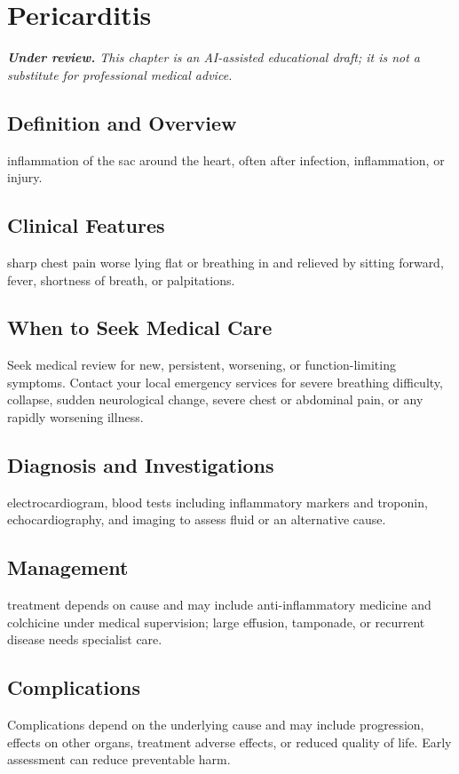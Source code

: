 \chapter{Pericarditis}

\medskip
\noindent\textit{\textbf{Under review.} This chapter is an AI-assisted educational draft; it is not a substitute for professional medical advice.}

\section*{Definition and Overview}
inflammation of the sac around the heart, often after infection, inflammation, or injury.

\section*{Clinical Features}
sharp chest pain worse lying flat or breathing in and relieved by sitting forward, fever, shortness of breath, or palpitations.

\section*{When to Seek Medical Care}
Seek medical review for new, persistent, worsening, or function-limiting symptoms. Contact your local emergency services for severe breathing difficulty, collapse, sudden neurological change, severe chest or abdominal pain, or any rapidly worsening illness.

\section*{Diagnosis and Investigations}
electrocardiogram, blood tests including inflammatory markers and troponin, echocardiography, and imaging to assess fluid or an alternative cause.

\section*{Management}
treatment depends on cause and may include anti-inflammatory medicine and colchicine under medical supervision; large effusion, tamponade, or recurrent disease needs specialist care.

\section*{Complications}
Complications depend on the underlying cause and may include progression, effects on other organs, treatment adverse effects, or reduced quality of life. Early assessment can reduce preventable harm.

